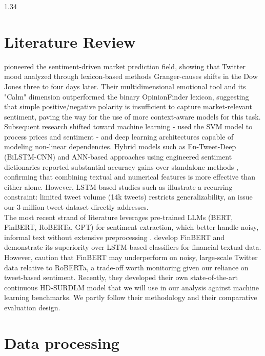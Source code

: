 \documentclass{article}
\begin{document}
\begin{setstretch}{1.34}
\section{Literature Review}
\textcite{bollen2011twitter} pioneered the sentiment-driven market prediction field, showing that Twitter mood analyzed through lexicon-based methods Granger-causes shifts in the Dow Jones three to four days later. Their multidimensional emotional tool and its "Calm" dimension outperformed the binary OpinionFinder lexicon, suggesting that simple positive/negative polarity is insufficient to capture market-relevant sentiment, paving the way for the use of more context-aware models for this task.\\

Subsequent research shifted toward machine learning - \textcite{nguyen-shirai-2015-topic} used the SVM model to process prices and sentiment - and deep learning architectures capable of modeling non-linear dependencies. Hybrid models such as En-Tweet-Deep (BiLSTM-CNN) and ANN-based approaches using engineered sentiment dictionaries reported substantial accuracy gains over standalone methods \autocite{gupta2025investigating}, confirming that combining textual and numerical features is more effective than either alone. However, LSTM-based studies such as \textcite{bacco2024investigating} illustrate a recurring constraint: limited tweet volume (14k tweets) restricts generalizability, an issue our 3-million-tweet dataset directly addresses. \\

The most recent strand of literature leverages pre-trained LLMs (BERT, FinBERT, RoBERTa, GPT) for sentiment extraction, which better handle noisy, informal text without extensive preprocessing \autocite{gupta2025investigating}. \textcite{araci2019finbert} develop FinBERT and demonstrate its superiority over LSTM-based classifiers for financial textual data. However, \textcite{shao2025revisiting} caution that FinBERT may underperform on noisy, large-scale Twitter data relative to RoBERTa, a trade-off worth monitoring given our reliance on tweet-based sentiment.  Recently, they developed their own state-of-the-art continuous HD-SURDLM model that we will use in our analysis against machine learning benchmarks. We partly follow their methodology and their comparative evaluation design. \\


\section{Data processing}

\end{setstretch}
\end{document}
